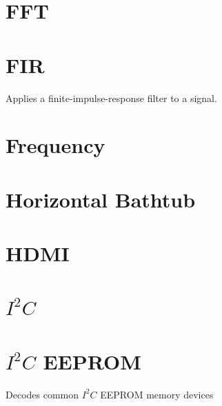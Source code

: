 \section{FFT}

\pagebreak
\section{FIR}

Applies a finite-impulse-response filter to a signal.

\pagebreak
\section{Frequency}

\pagebreak
\section{Horizontal Bathtub}

\pagebreak
\section{HDMI}
\label{filter:hdmi}

\pagebreak
\section{$I^2C$}

\pagebreak
\section{$I^2C$ EEPROM}

Decodes common $I^2C$ EEPROM memory devices

\pagebreak
